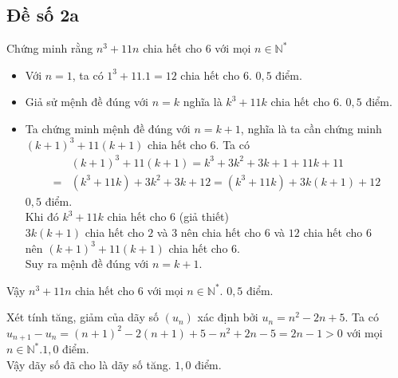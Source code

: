 \subsection{Đề số 2a}
\setcounter{bt}{0}

\begin{bt}%
Chứng minh rằng $n^3+11n$ chia hết cho $6$ với mọi $n \in \mathbb{N^*}$
\loigiai
{
\begin{itemize}
\item Với $n=1$, ta có $1^3+11.1=12$ chia hết cho $6$. \dotfill $0,5$ điểm.
\item Giả sử mệnh đề đúng với $n=k$ nghĩa là $k^3+11k$ chia hết cho $6$. \dotfill $0,5$ điểm.\\
\item Ta chứng minh mệnh đề đúng với $n=k+1$, nghĩa là ta cần chứng minh $(k+1)^3+11(k+1)$ chia hết cho $6$. Ta có
\begin{align*}
&(k+1)^3+11(k+1)=k^3+3k^2+3k+1+11k+11\\=&(k^3+11k)+3k^2+3k+12=(k^3+11k)+3k(k+1)+12
\end{align*} \dotfill $0,5$ điểm.\\
Khi đó $k^3+11k$ chia hết cho $6$ (giả thiết)\\
$3k(k+1)$ chia hết cho $2$ và $3$ nên chia hết cho $6$ và $12$ chia hết cho $6$\\
nên $(k+1)^3+11(k+1)$ chia hết cho $6$.\\
Suy ra mệnh đề đúng với $n=k+1$.
\end{itemize}
Vậy $n^3+11n$ chia hết cho $6$ với mọi $n \in \mathbb{N^*}$. \dotfill $0,5$ điểm.\\
}
\end{bt}

\begin{bt}%
Xét tính tăng, giảm của dãy số $(u_n)$ xác định bởi $u_n=n^2-2n+5$.
\loigiai
{
Ta có\\
$u_{n+1}-u_n=(n+1)^2-2(n+1)+5-n^2+2n-5=2n-1>0$ với mọi $n \in \mathbb{N^*}$.\dotfill $1,0$ điểm.\\
Vậy dãy số đã cho là dãy số tăng. \dotfill $1,0$ điểm.\\
}
\end{bt}

